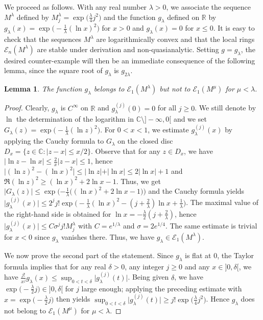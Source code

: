 \documentclass[a4paper]{amsart}
\theoremstyle{plain}
\newtheorem{lem}{Lemma}
\theoremstyle{remark}
\begin{document}
We proceed as follows. With any real number $ \lambda>0 $, we associate the sequence $ M^\lambda $ defined by $ M_j^\lambda=\exp\bigl(\frac{\lambda}{4}j^2\bigr) $ and the function $ g_\lambda $ defined on $ \mathbb{R} $ by $ g_\lambda(x)=\exp\bigl(-\frac{1}{\lambda}(\ln x)^2\bigr) $ for $ x> 0 $ and $ g_\lambda(x)=0 $ for $ x\leq 0 $. It is easy to check that the sequences $ M^\lambda $ are logarithmically convex and that the local rings $ \mathcal{E}_n(M^\lambda) $ are stable under derivation and non-quasianalytic. Setting $ g=g_\lambda $, the desired counter-example will then be an immediate consequence of the following lemma, since the square root of $ g_\lambda $ is $ g_{2\lambda} $.

\begin{lem}\label{glam} 
The function $ g_\lambda $ belongs to $ \mathcal{E}_1(M^\lambda) $ but not to $ \mathcal{E}_1(M^{\mu}) $ for $ \mu<\lambda $.
\end{lem}

\begin{proof} Clearly, $ g_\lambda $ is $ C^\infty $ on $ \mathbb{R} $ and $ g_\lambda^{(j)}(0)=0 $ for all $ j\geq 0 $. We still denote by $ \ln $ the determination of the logarithm in $ \mathbb{C}\setminus ]-\infty,0[ $ and we set $ G_\lambda(z)=\exp\bigl(-\frac{1}{\lambda}(\ln z)^2\bigr) $. For $ 0<x<1 $, we estimate $g_\lambda^{(j)}(x)$ by applying the Cauchy formula to $ G_\lambda $ on the closed disc $ D_x =\{z\in\mathbb{C} : \vert z-x\vert \leq x/2\} $. Observe that for any $ z\in D_x $, we have 
$ \vert \ln z-\ln x \vert\leq \frac{2}{x}\vert z-x\vert\leq 1 $, hence $ \vert (\ln z)^2-(\ln x)^2\vert\leq \vert \ln z\vert +\vert\ln x\vert\leq 2\vert \ln x\vert +1 $ and $\Re (\ln z)^2\geq (\ln x)^2 +2\ln x-1 $. Thus, we get  
$ \vert G_\lambda(z)\vert \leq \exp(-\frac{1}{\lambda}\bigl((\ln x)^2+2\ln x-1\bigr)\bigr) $ and 
the Cauchy formula yields $ \vert g_\lambda^{(j)}(x)\vert\leq  2^j j!
\exp\Big(-\frac{1}{\lambda}(\ln x)^2 -(j+\frac{2}{\lambda})\ln x+\frac{1}{ \lambda}\Big) $. The maximal value of the right-hand side is obtained for $ \ln x = - \frac{\lambda}{2}(j+\frac{2}{\lambda}) $, hence $  \vert g_\lambda^{(j)}(x)\vert\leq C \sigma^j j! M_j^\lambda $ with $ C=e^{1/\lambda} $ and $ \sigma=2e^{1/4} $. The same estimate is trivial for $ x<0 $ since $ g_\lambda $ vanishes there. Thus, we have $ g_\lambda\in \mathcal{E}_1(M^\lambda) $. 


We now prove the second part of the statement. Since $ g_\lambda $ is flat at $ 0 $, the Taylor formula implies 
that for any real $ \delta>0 $, any integer $ j\geq 0 $ and any $ x\in ]0,\delta[ $,  we have 
$ \frac{j!}{x^j} g_\lambda(x)\leq \sup_{0<t<\delta}\vert g_\lambda^{(j)}(t)\vert $. Being given $ \delta $, we have $ \exp\bigl(-\frac{\lambda}{2}j\bigr)\in ]0,\delta[ $  for $ j $ large enough; applying the preceding estimate with $ x=\exp\bigl(-\frac{\lambda}{2}j\bigr) $ then yields 
$  \sup_{0<t<\delta}\vert g_\lambda^{(j)}(t)\vert\geq j!\exp(\frac{\lambda}{4}j^2\bigr)
$. Hence $ g_\lambda $ does not belong to $ \mathcal{E}_1(M^\mu) $ for $ \mu<\lambda $.
\end{proof}
\end{document}
